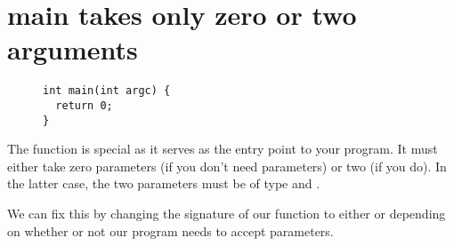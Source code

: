 \section{main takes only zero or two arguments}\label{sec:main-two-args}

\begin{figure}[htb]
\begin{lstlisting}
int main(int argc) {
  return 0;
}
\end{lstlisting}
\label{ex:main-two-args}
\end{figure}

The  function is special as it serves as the entry point to your program.
It must either take zero parameters (if you don't need parameters) or two (if you do).
In the latter case, the two parameters must be of type  and .

We can fix this by changing the signature of our  function to either  or  depending on whether or not our program needs to accept parameters.
\newpage